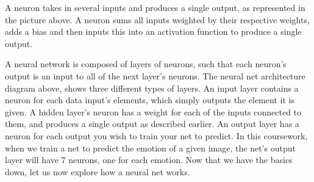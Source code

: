 A neuron takes in several inputs and produces a single output, as represented in the picture above.
A neuron sums all inputs weighted by their respective weights,
adds a bias and then inputs this into an activation function to produce a single output.

A neural network is composed of layers of neurons,
such that each neuron's output is an input to all of the next layer's neurons.
The neural net architecture diagram above, shows three different types of layers.
An input layer contains a neuron for each data input's elements, which simply outputs the element it is given.
A hidden layer's neuron has a weight for each of the inputs connected to them,
and produces a single output as described earlier.
An output layer has a neuron for each output you wish to train your net to predict.
In this coursework, when we train a net to predict the emotion of a given image,
the net's output layer will have 7 neurons, one for each emotion.
Now that we have the basics down, let us now explore how a neural net works.

